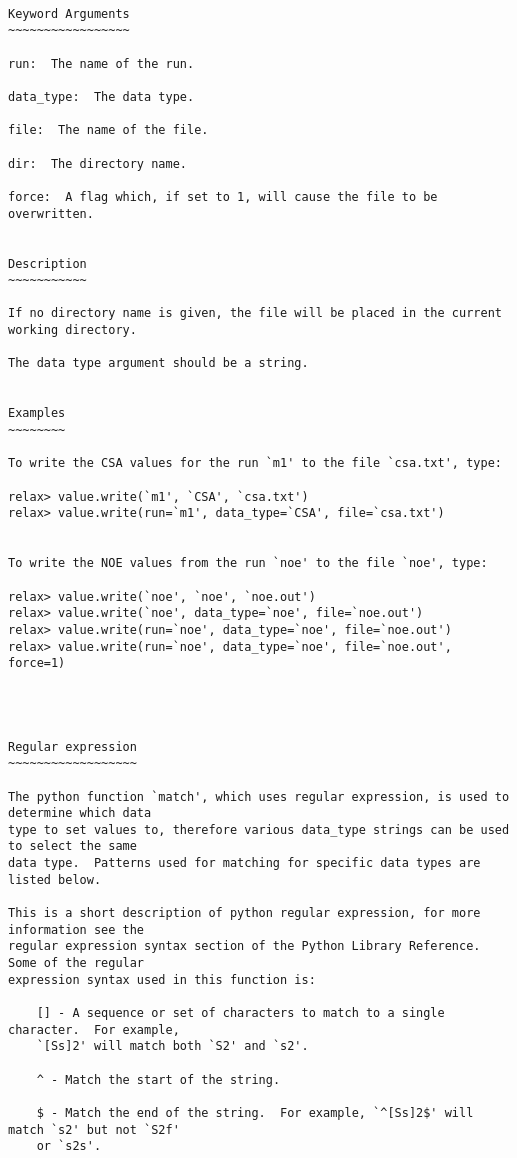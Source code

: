 {\scriptsize
\begin{verbatim}

Keyword Arguments
~~~~~~~~~~~~~~~~~

run:  The name of the run.

data_type:  The data type.

file:  The name of the file.

dir:  The directory name.

force:  A flag which, if set to 1, will cause the file to be overwritten.


Description
~~~~~~~~~~~

If no directory name is given, the file will be placed in the current working directory.

The data type argument should be a string.


Examples
~~~~~~~~

To write the CSA values for the run `m1' to the file `csa.txt', type:

relax> value.write(`m1', `CSA', `csa.txt')
relax> value.write(run=`m1', data_type=`CSA', file=`csa.txt')


To write the NOE values from the run `noe' to the file `noe', type:

relax> value.write(`noe', `noe', `noe.out')
relax> value.write(`noe', data_type=`noe', file=`noe.out')
relax> value.write(run=`noe', data_type=`noe', file=`noe.out')
relax> value.write(run=`noe', data_type=`noe', file=`noe.out', force=1)




Regular expression
~~~~~~~~~~~~~~~~~~

The python function `match', which uses regular expression, is used to determine which data
type to set values to, therefore various data_type strings can be used to select the same
data type.  Patterns used for matching for specific data types are listed below.

This is a short description of python regular expression, for more information see the
regular expression syntax section of the Python Library Reference.  Some of the regular
expression syntax used in this function is:

    [] - A sequence or set of characters to match to a single character.  For example,
    `[Ss]2' will match both `S2' and `s2'.

    ^ - Match the start of the string.

    $ - Match the end of the string.  For example, `^[Ss]2$' will match `s2' but not `S2f'
    or `s2s'.


\end{verbatim}}
